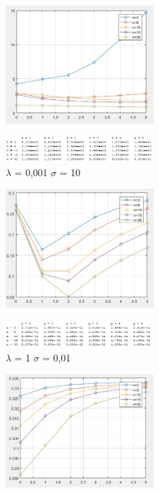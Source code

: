 \begin{figure}[h]
	\centering
	\includegraphics[width=0.5\textwidth]{pl0001s10.png}
\end{figure}

\begin{figure}[h]
	\centering
	\includegraphics[width=0.5\textwidth]{tl0001s10.png}
	\caption{$\lambda$ = 0,001 $\sigma$ = 10}
	\label{fig:lambda = 0,001 sigma = 10}
\end{figure}

\begin{figure}[h]
	\centering
	\includegraphics[width=0.5\textwidth]{pl1s001.png}
\end{figure}

\begin{figure}[h]
	\centering
	\includegraphics[width=0.5\textwidth]{tl1s001.png}
	\caption{$\lambda$ = 1 $\sigma$ = 0,01}
	\label{fig:lambda = 1 sigma = 0,01}
\end{figure}

\begin{figure}[h]
	\centering
	\includegraphics[width=0.5\textwidth]{pl100s01.png}
\end{figure}

